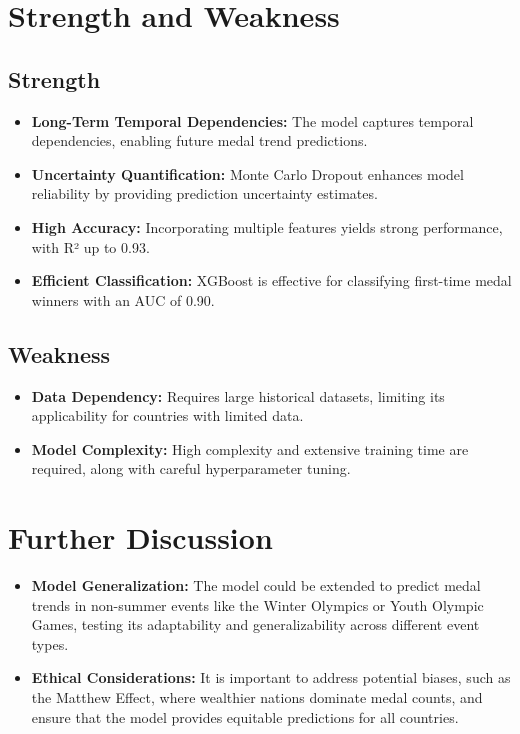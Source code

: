 \documentclass{mcmthesis}
\begin{document}
\section{Strength and Weakness}


\subsection{Strength}
\begin{itemize}[leftmargin=0.15in, labelsep=0.1in, itemsep=10pt, parsep=5pt]
	\item \textbf{Long-Term Temporal Dependencies:} The model captures temporal dependencies, enabling future medal trend predictions.
	\item \textbf{Uncertainty Quantification:} Monte Carlo Dropout enhances model reliability by providing prediction uncertainty estimates.
	\item \textbf{High Accuracy:} Incorporating multiple features yields strong performance, with R² up to 0.93.
	\item \textbf{Efficient Classification:} XGBoost is effective for classifying first-time medal winners with an AUC of 0.90.
\end{itemize}

\subsection{Weakness}
\begin{itemize}[leftmargin=0.15in, labelsep=0.1in, itemsep=10pt, parsep=5pt]
	\item \textbf{Data Dependency:} Requires large historical datasets, limiting its applicability for countries with limited data.
	\item \textbf{Model Complexity:} High complexity and extensive training time are required, along with careful hyperparameter tuning.
\end{itemize}

	
\section{Further Discussion}

\begin{itemize}[leftmargin=0.15in, labelsep=0.1in, itemsep=10pt, parsep=5pt]
	\item \textbf{Model Generalization:} The model could be extended to predict medal trends in non-summer events like the Winter Olympics or Youth Olympic Games, testing its adaptability and generalizability across different event types.
	\item \textbf{Ethical Considerations:} It is important to address potential biases, such as the Matthew Effect, where wealthier nations dominate medal counts, and ensure that the model provides equitable predictions for all countries.
\end{itemize}
\end{document}
